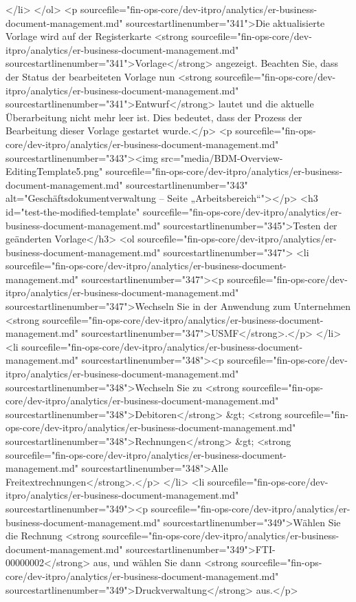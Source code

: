 </li>
</ol>
<p sourcefile="fin-ops-core/dev-itpro/analytics/er-business-document-management.md" sourcestartlinenumber="341">Die aktualisierte Vorlage wird auf der Registerkarte <strong sourcefile="fin-ops-core/dev-itpro/analytics/er-business-document-management.md" sourcestartlinenumber="341">Vorlage</strong> angezeigt. Beachten Sie, dass der Status der bearbeiteten Vorlage nun <strong sourcefile="fin-ops-core/dev-itpro/analytics/er-business-document-management.md" sourcestartlinenumber="341">Entwurf</strong> lautet und die aktuelle Überarbeitung nicht mehr leer ist. Dies bedeutet, dass der Prozess der Bearbeitung dieser Vorlage gestartet wurde.</p>
<p sourcefile="fin-ops-core/dev-itpro/analytics/er-business-document-management.md" sourcestartlinenumber="343"><img src="media/BDM-Overview-EditingTemplate5.png" sourcefile="fin-ops-core/dev-itpro/analytics/er-business-document-management.md" sourcestartlinenumber="343" alt="Geschäftsdokumentverwaltung – Seite „Arbeitsbereich“"></p>
<h3 id="test-the-modified-template" sourcefile="fin-ops-core/dev-itpro/analytics/er-business-document-management.md" sourcestartlinenumber="345">Testen der geänderten Vorlage</h3>
<ol sourcefile="fin-ops-core/dev-itpro/analytics/er-business-document-management.md" sourcestartlinenumber="347">
<li sourcefile="fin-ops-core/dev-itpro/analytics/er-business-document-management.md" sourcestartlinenumber="347"><p sourcefile="fin-ops-core/dev-itpro/analytics/er-business-document-management.md" sourcestartlinenumber="347">Wechseln Sie in der Anwendung zum Unternehmen <strong sourcefile="fin-ops-core/dev-itpro/analytics/er-business-document-management.md" sourcestartlinenumber="347">USMF</strong>.</p>
</li>
<li sourcefile="fin-ops-core/dev-itpro/analytics/er-business-document-management.md" sourcestartlinenumber="348"><p sourcefile="fin-ops-core/dev-itpro/analytics/er-business-document-management.md" sourcestartlinenumber="348">Wechseln Sie zu <strong sourcefile="fin-ops-core/dev-itpro/analytics/er-business-document-management.md" sourcestartlinenumber="348">Debitoren</strong> &gt; <strong sourcefile="fin-ops-core/dev-itpro/analytics/er-business-document-management.md" sourcestartlinenumber="348">Rechnungen</strong> &gt; <strong sourcefile="fin-ops-core/dev-itpro/analytics/er-business-document-management.md" sourcestartlinenumber="348">Alle Freitextrechnungen</strong>.</p>
</li>
<li sourcefile="fin-ops-core/dev-itpro/analytics/er-business-document-management.md" sourcestartlinenumber="349"><p sourcefile="fin-ops-core/dev-itpro/analytics/er-business-document-management.md" sourcestartlinenumber="349">Wählen Sie die Rechnung <strong sourcefile="fin-ops-core/dev-itpro/analytics/er-business-document-management.md" sourcestartlinenumber="349">FTI-00000002</strong> aus, und wählen Sie dann <strong sourcefile="fin-ops-core/dev-itpro/analytics/er-business-document-management.md" sourcestartlinenumber="349">Druckverwaltung</strong> aus.</p>
